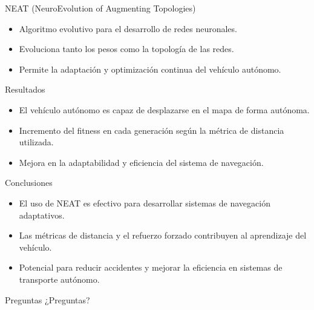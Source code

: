 \documentclass{beamer}
\begin{document}
\begin{frame}{NEAT (NeuroEvolution of Augmenting Topologies)}
    \begin{itemize}
        \item Algoritmo evolutivo para el desarrollo de redes neuronales.
        \item Evoluciona tanto los pesos como la topología de las redes.
        \item Permite la adaptación y optimización continua del vehículo autónomo.
    \end{itemize}
\end{frame}

\begin{frame}{Resultados}
    \begin{itemize}
        \item El vehículo autónomo es capaz de desplazarse en el mapa de forma autónoma.
        \item Incremento del fitness en cada generación según la métrica de distancia utilizada.
        \item Mejora en la adaptabilidad y eficiencia del sistema de navegación.
    \end{itemize}
\end{frame}

\begin{frame}{Conclusiones}
    \begin{itemize}
        \item El uso de NEAT es efectivo para desarrollar sistemas de navegación adaptativos.
        \item Las métricas de distancia y el refuerzo forzado contribuyen al aprendizaje del vehículo.
        \item Potencial para reducir accidentes y mejorar la eficiencia en sistemas de transporte autónomo.
    \end{itemize}
\end{frame}

\begin{frame}{Preguntas}
    \centering
    {\Huge ¿Preguntas?}
\end{frame}
\end{document}
